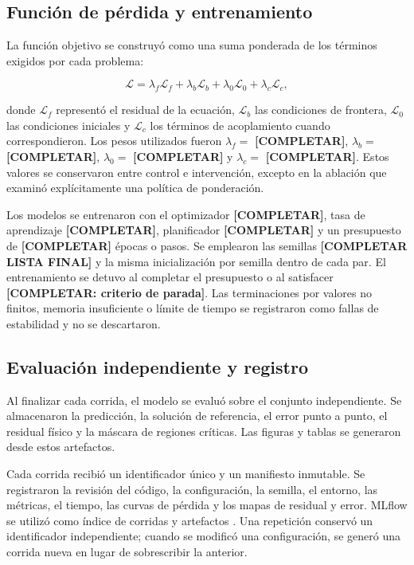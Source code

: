 \subsection{Función de pérdida y entrenamiento}

La función objetivo se construyó como una suma ponderada de los términos exigidos por cada problema:

$$
\mathcal{L}=\lambda_f\mathcal{L}_f+\lambda_b\mathcal{L}_b+\lambda_0\mathcal{L}_0+\lambda_c\mathcal{L}_c,
$$

donde $\mathcal{L}_f$ representó el residual de la ecuación, $\mathcal{L}_b$ las condiciones de frontera, $\mathcal{L}_0$ las condiciones iniciales y $\mathcal{L}_c$ los términos de acoplamiento cuando correspondieron. Los pesos utilizados fueron $\lambda_f=$ \textbf{[COMPLETAR]}, $\lambda_b=$ \textbf{[COMPLETAR]}, $\lambda_0=$ \textbf{[COMPLETAR]} y $\lambda_c=$ \textbf{[COMPLETAR]}. Estos valores se conservaron entre control e intervención, excepto en la ablación que examinó explícitamente una política de ponderación.

Los modelos se entrenaron con el optimizador \textbf{[COMPLETAR]}, tasa de aprendizaje \textbf{[COMPLETAR]}, planificador \textbf{[COMPLETAR]} y un presupuesto de \textbf{[COMPLETAR]} épocas o pasos. Se emplearon las semillas \textbf{[COMPLETAR LISTA FINAL]} y la misma inicialización por semilla dentro de cada par. El entrenamiento se detuvo al completar el presupuesto o al satisfacer \textbf{[COMPLETAR: criterio de parada]}. Las terminaciones por valores no finitos, memoria insuficiente o límite de tiempo se registraron como fallas de estabilidad y no se descartaron.

\subsection{Evaluación independiente y registro}

Al finalizar cada corrida, el modelo se evaluó sobre el conjunto independiente. Se almacenaron la predicción, la solución de referencia, el error punto a punto, el residual físico y la máscara de regiones críticas. Las figuras y tablas se generaron desde estos artefactos.

Cada corrida recibió un identificador único y un manifiesto inmutable. Se registraron la revisión del código, la configuración, la semilla, el entorno, las métricas, el tiempo, las curvas de pérdida y los mapas de residual y error. MLflow se utilizó como índice de corridas y artefactos \cite{zaharia2018mlflow}. Una repetición conservó un identificador independiente; cuando se modificó una configuración, se generó una corrida nueva en lugar de sobrescribir la anterior.

